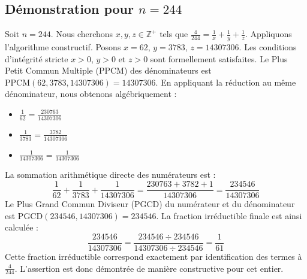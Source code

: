\documentclass[11pt,a4paper]{article}
\begin{document}
\subsection{Démonstration pour $n = 244$}
Soit $n = 244$. Nous cherchons $x, y, z \in \mathbb{Z}^{+}$ tels que $\frac{4}{244} = \frac{1}{x} + \frac{1}{y} + \frac{1}{z}$.
Appliquons l'algorithme constructif. Posons $x = 62$, $y = 3783$, $z = 14307306$.
Les conditions d'intégrité stricte $x > 0$, $y > 0$ et $z > 0$ sont formellement satisfaites.
Le Plus Petit Commun Multiple (PPCM) des dénominateurs est $\text{PPCM}(62, 3783, 14307306) = 14307306$.
En appliquant la réduction au même dénominateur, nous obtenons algébriquement :
\begin{itemize}
    \item $\frac{1}{62} = \frac{230763}{14307306}$
    \item $\frac{1}{3783} = \frac{3782}{14307306}$
    \item $\frac{1}{14307306} = \frac{1}{14307306}$
\end{itemize}
La sommation arithmétique directe des numérateurs est :
$$ \frac{1}{62} + \frac{1}{3783} + \frac{1}{14307306} = \frac{230763 + 3782 + 1}{14307306} = \frac{234546}{14307306} $$
Le Plus Grand Commun Diviseur (PGCD) du numérateur et du dénominateur est $\text{PGCD}(234546, 14307306) = 234546$.
La fraction irréductible finale est ainsi calculée :
$$ \frac{234546}{14307306} = \frac{234546 \div 234546}{14307306 \div 234546} = \frac{1}{61} $$
Cette fraction irréductible correspond exactement par identification des termes à $\frac{4}{244}$. L'assertion est donc démontrée de manière constructive pour cet entier.
\end{document}
